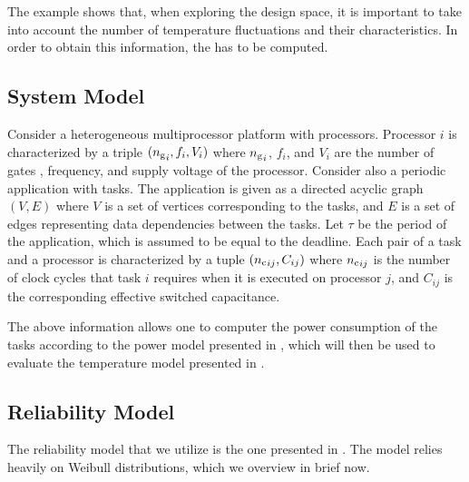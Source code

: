 The example shows that, when exploring the design space, it is important to
take into account the number of temperature fluctuations and their
characteristics. In order to obtain this information, the  has to be
computed.

\subsection{System Model}

Consider a heterogeneous multiprocessor platform with \np processors. Processor
$i$ is characterized by a triple $({n_\mathrm{g}}_i, f_i, V_i)$ where
${n_\mathrm{g}}_i$, $f_i$, and $V_i$ are the number of gates \cite{liao2005},
frequency, and supply voltage of the processor. Consider also a periodic
application with \nt tasks. The application is given as a directed acyclic graph
$(V, E)$ where $V$ is a set of vertices corresponding to the tasks, and $E$ is a
set of edges representing data dependencies between the tasks. Let $\tau$ be the
period of the application, which is assumed to be equal to the deadline. Each
pair of a task and a processor is characterized by a tuple $({n_\mathrm{c}}_{ij},
C_{ij})$ where ${n_\mathrm{c}}_{ij}$ is the number of clock cycles that task $i$
requires when it is executed on processor $j$, and $C_{ij}$ is the corresponding
effective switched capacitance.

The above information allows one to computer the power consumption of the tasks
according to the power model presented in , which will then be
used to evaluate the temperature model presented in .

\subsection{Reliability Model}
\newcommand{\mean}{\mu}
\newcommand{\scale}{\eta}
\newcommand{\shape}{\beta}

The reliability model that we utilize is the one presented in \cite{huang2009,
xiang2010}. The model relies heavily on Weibull distributions, which we overview
in brief now.

